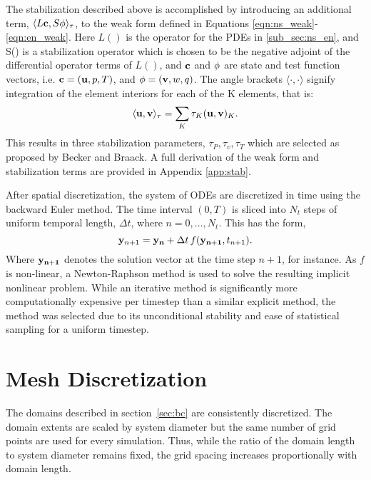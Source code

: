 The stabilization described above is accomplished by introducing an additional term,
$\langle L{\bf c},S {\bf \phi} \rangle_\tau$, to the weak form defined in Equations
\ref{eqn:ns_weak}-\ref{eqn:en_weak}. Here $L()$ is the operator for the PDEs
in \ref{sub_sec:ns_en}, and S() is a stabilization operator
which is chosen to be the negative adjoint of the differential operator
terms of $L()$, and ${\bf c}$ and ${\bf \phi}$ are state and test
function vectors, i.e. $ {\bf c}= ({\bf u},p,T)$, and ${\bf \phi} = (
{\bf v},w,q )$. The angle brackets $\langle \cdot,\cdot \rangle$ signify
integration of the element interiors for each of the K elements, that is:
\begin{equation}
 \langle {\bf u},{\bf v} \rangle_\tau = \sum_K \tau_K({\bf u},{\bf v})_K.
\end{equation}
This results in three stabilization parameters, $\tau_P, \tau_v, \tau_T$ 
which are selected as proposed by Becker and Braack. 
A full derivation of the weak form and stabilization terms are provided
in Appendix \ref{app:stab}. 

After spatial discretization, the system of ODEs are discretized in time
using the backward Euler method\cite{moin2010fundamentals}. The time
interval $(0,T)$ is sliced into $N_t$ steps of uniform temporal length,
$\Delta t$, where $n = 0,\dots,N_t$.  
This has the form, 
\begin{equation}
 {\bf y}_{n+1} = {\bf y_n } + \Delta t \, f({\bf y_{n+1}},t_{n+1}).
\end{equation}
Where ${\bf y_{n+1}}$ denotes the solution vector at the time step $n+1$, for
instance. As $f$ is non-linear, a Newton-Raphson method is used to solve
the resulting implicit nonlinear problem. While an iterative method is
significantly more computationally expensive per timestep than a similar
explicit method, the method was selected due to its unconditional
stability and ease of statistical sampling for a uniform timestep.  

%
%


\section{Mesh Discretization}

%
%
The domains described in section~\ref{sec:bc} are
consistently discretized. The domain extents
are scaled by system diameter but the same number of grid points are used
for every simulation. Thus, while the ratio of the domain length to system
diameter remains fixed, the grid spacing increases proportionally with
domain length. 

